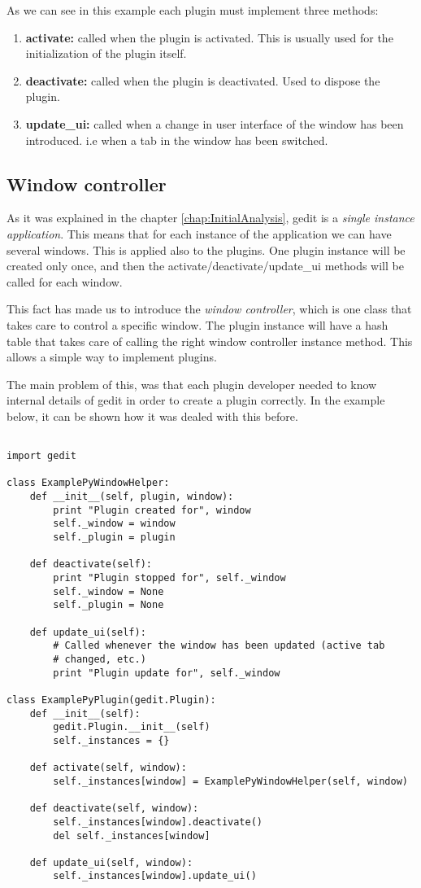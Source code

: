 As we can see in this example each plugin must implement three methods:
\begin{enumerate}
  \item \textbf{activate:} called when the plugin is activated. This is usually used for the initialization of the plugin itself.
  \item \textbf{deactivate:} called when the plugin is deactivated. Used to dispose the plugin.
  \item \textbf{update\_ui:} called when a change in user interface of the window has been introduced. i.e when a tab in the window has been switched.
\end{enumerate}

\subsection{Window controller}

As it was explained in the chapter \ref{chap:InitialAnalysis}, gedit is a \emph{single instance application}. This means that for each instance of the application we can have several windows. This is applied also to the plugins. One plugin instance will be created only once, and then the activate/deactivate/update\_ui methods will be called for each window.

This fact has made us to introduce the \emph{window controller}, which is one class that takes care to control a specific window. The plugin instance will have a hash table that takes care of calling the right window controller instance method. This allows a simple way to implement plugins.

The main problem of this, was that each plugin developer needed to know internal details of gedit in order to create a plugin correctly. In the example below, it can be shown how it was dealed with this before.

\begin{lstlisting}[style=python]

import gedit

class ExamplePyWindowHelper:
    def __init__(self, plugin, window):
        print "Plugin created for", window
        self._window = window
        self._plugin = plugin

    def deactivate(self):
        print "Plugin stopped for", self._window
        self._window = None
        self._plugin = None

    def update_ui(self):
        # Called whenever the window has been updated (active tab
        # changed, etc.)
        print "Plugin update for", self._window

class ExamplePyPlugin(gedit.Plugin):
    def __init__(self):
        gedit.Plugin.__init__(self)
        self._instances = {}

    def activate(self, window):
        self._instances[window] = ExamplePyWindowHelper(self, window)

    def deactivate(self, window):
        self._instances[window].deactivate()
        del self._instances[window]

    def update_ui(self, window):
        self._instances[window].update_ui()

\end{lstlisting}


